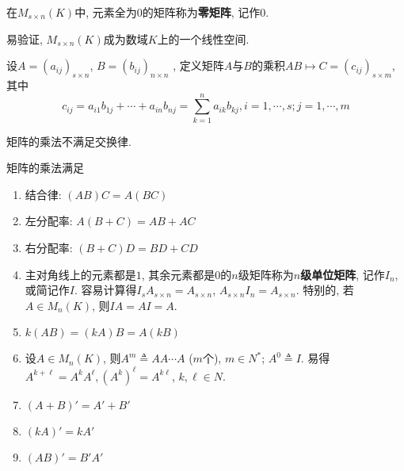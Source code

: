 \begin{Definition} 在$M_{s \times n}(K)$中, 
元素全为$0$的矩阵称为\textbf{零矩阵}, 记作$0$.
\end{Definition}

\begin{Note}
易验证, $M_{s \times n}(K)$成为数域$K$上的一个线性空间.
\end{Note}

\begin{Definition}
设$A = (a_{ij})_{s \times n}$, 
$B = (b_{ij})_{n \times n}$
, 定义矩阵$A$与$B$的乘积$AB \mapsto C = (c_{ij})_{s \times m}$, 其中
\[
c_{ij} = a_{i1}b_{1j} + \cdots + a_{in} b_{nj} = 
\sum_{k=1}^n a_{ik} b_{kj}, i = 1, \cdots, s; j = 1, \cdots, m
\]
\end{Definition}

\begin{Note}
矩阵的乘法不满足交换律.
\end{Note}

\begin{Note}
矩阵的乘法满足
\begin{enumerate}[(1)]
\item 结合律: $(AB)C = A(BC)$
\item 左分配率: $A(B + C) = AB + AC$
\item 右分配率: $(B + C)D = BD + CD$
\item 主对角线上的元素都是$1$, 其余元素都是$0$的$n$级矩阵称为\textbf{$n$级单位矩阵}, 记作$I_n$, 
或简记作$I$. 容易计算得$I_s A_{s \times n} = A_{s \times n}$, $A_{s \times n} I_n = A_{s \times n}$.
特别的, 若$A \in M_n(K)$, 则$IA = AI = A$.
\item $k(AB) = (kA)B = A(kB)$
\item 设$A \in M_n(K)$, 则$A^m \triangleq A A \cdots A$ ($m$个), $m \in N^*$; $A^0 \triangleq I$. 易得$A^{k + \ell} = A^k A^\ell, (A^k)^\ell = A^{k\ell}$, $k, \ell \in N$.
\item $(A + B)' = A' + B'$
\item $(kA)' = kA'$
\item $(AB)' = B'A'$
\end{enumerate}
\end{Note}

